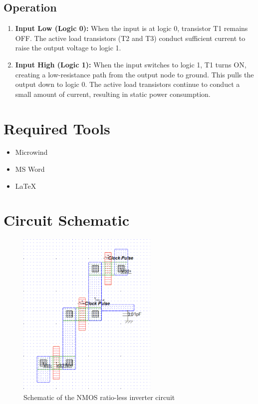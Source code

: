 \documentclass[12pt]{article}
\begin{document}
\subsection*{Operation}
\begin{enumerate}
    \item \textbf{Input Low (Logic 0):} When the input is at logic 0, transistor T1 remains OFF. The active load transistors (T2 and T3) conduct sufficient current to raise the output voltage to logic 1.
    \item \textbf{Input High (Logic 1):} When the input switches to logic 1, T1 turns ON, creating a low-resistance path from the output node to ground. This pulls the output down to logic 0. The active load transistors continue to conduct a small amount of current, resulting in static power consumption.
\end{enumerate}

\section*{Required Tools}
\begin{itemize}
    \item Microwind
    \item MS Word
    \item \LaTeX
\end{itemize}

\section*{Circuit Schematic}

\begin{figure}[H]
    \centering
    \includegraphics[width=0.6\textwidth]{ckt.png}
    \caption{Schematic of the NMOS ratio-less inverter circuit}
\end{figure}
\end{document}
